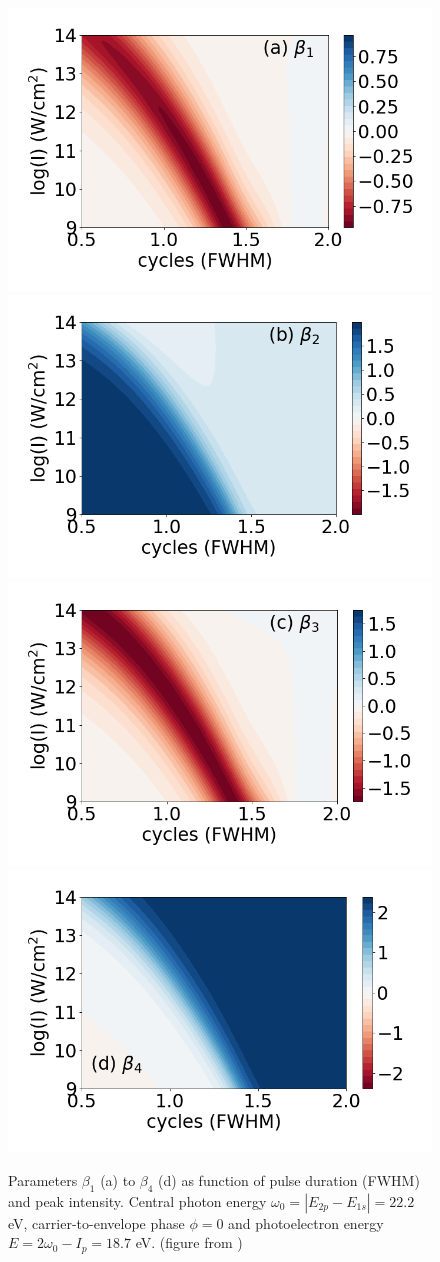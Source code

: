 \begin{figure}[!ht]
\centering
\includegraphics[width=0.49\linewidth]{figs/Photo_ionization/short_pulse/beta_1_heat.png}
\includegraphics[width=0.49\linewidth]{figs/Photo_ionization/short_pulse/beta_2_heat.png}\\
\includegraphics[width=0.49\linewidth]{figs/Photo_ionization/short_pulse/beta_3_heat.png}
\includegraphics[width=0.49\linewidth]{figs/Photo_ionization/short_pulse/beta_4_heat.png}
\caption{
Parameters $\beta_1$ (a) to $\beta_4$ (d) as function of pulse duration (FWHM) and peak intensity. Central photon energy $\omega_0 = |E_{2p} - E_{1s}| = 22.2$ eV, carrier-to-envelope phase $\phi=0$ and photoelectron energy $E = 2\omega_0 - I_p = 18.7$ eV. (figure from \cite{venzke2020_ionization})
} 
  \label{fig:beta}
\end{figure}

